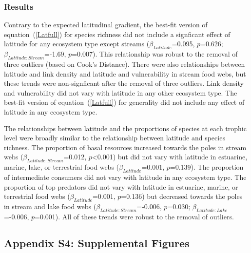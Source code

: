 \documentclass[12pt]{article}
\begin{document}
\begin{landscape}
  \subsubsection*{Results}
    Contrary to the expected latitudinal gradient, the best-fit version of
    equation~(\ref{Latfull}) for species richness did not include a signficant effect of latitude for any ecosystem type except streams
    ($\beta_{Latitude}$=0.095, $p$=0.626; $\beta_{Latitude:Stream}$=-1.69, $p$=0.007).  This
    relationship was robust to the removal of three outliers (based on Cook's Distance). 
    There were also relationships between latitude and link density and latitude and vulnerability
    in stream food webs, but these trends were non-signficant after the removal of three outliers.
    Link density and vulnerability did not vary with latitude in any other ecosystem type.
    The best-fit version of equation~(\ref{Latfull}) for generality did not include any effect of
    latitude in any ecosystem type. 


    The relationships between latitude and the proportions of species at each trophic level were broadly similar
    to the relationship between latitude and species richness. 
    The proportion of basal resources increased towards the poles in stream webs ($\beta_{Latitude:Stream}$=0.012, $p$\textless0.001) 
    but did not vary with latitude in estuarine, marine, lake, or terrestrial 
    food webs ($\beta_{Latitude}$=0.001, $p$=0.139).
    The proportion of intermediate consumers did not vary with latitude in any ecosystem type.
    The proportion of top predators did not vary with latitude in 
    estuarine, marine, or terrestrial food webs ($\beta_{Latitude}$=0.001, $p$=0.136) but decreased towards the poles in stream and lake food 
    webs ($\beta_{Latitude:Stream}$=-0.006, $p$=0.030; 
    $\beta_{Latitude:Lake}$=-0.006, $p$=0.001). 
    All of these trends were robust to the removal of outliers.

\subsection*{Appendix S4: Supplemental Figures}


\end{landscape}
\end{document}
